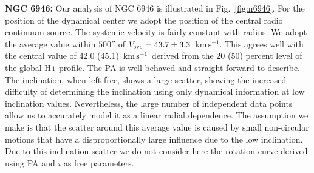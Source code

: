 \documentclass[usenatbib,usegraphicx,apjfonts,floatfix]{emulateapj}
\newcommand{\kms}{\ensuremath{\,\mbox{km}\,\mbox{s}^{-1}}}
\newcommand{\HI}{H\,{\sc i}}
\begin{document}
{\bf NGC 6946: } Our analysis of NGC 6946 is illustrated in
Fig.~\ref{fig:n6946}.  For the position of the dynamical center we
adopt the position of the central radio continuum source.  The
systemic velocity is fairly constant with radius. We adopt the average
value within $500''$ of $V_{\rm sys} = 43.7 \pm 3.3$ \kms.  This
agrees well with the central value of 42.0 (45.1) \kms\ derived from
the 20 (50) percent level of the global \HI\ profile.  The PA is
well-behaved and straight-forward to describe.  The inclination, when
left free, shows a large scatter, showing the increased difficulty of
determining the inclination using only dynamical information at low
inclination values. Nevertheless, the large number of independent data
points allow us to accurately model it as a linear radial dependence.
The assumption we make is that the scatter around this average value
is caused by small non-circular motions that have a disproportionally
large influence due to the low inclination.  Due to this inclination
scatter we do not consider here the rotation curve derived using PA
and $i$ as free parameters.
\end{document}
